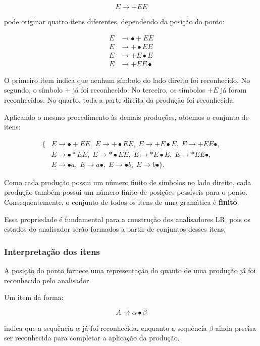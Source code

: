 \documentclass[
  brazilian,
  letterpaper,
]{book}
\theoremstyle{plain}
\theoremstyle{definition}
\theoremstyle{remark}
\begin{document}
\[
E\rightarrow +EE
\]

pode originar quatro itens diferentes, dependendo da posição do ponto:

\[
\begin{aligned}
E&\rightarrow\bullet +EE\\
E&\rightarrow+\bullet EE\\
E&\rightarrow+E\bullet E\\
E&\rightarrow+EE\bullet
\end{aligned}
\]

O primeiro item indica que nenhum símbolo do lado direito foi
reconhecido. No segundo, o símbolo \(+\) já foi reconhecido. No
terceiro, os símbolos \(+E\) já foram reconhecidos. No quarto, toda a
parte direita da produção foi reconhecida.

Aplicando o mesmo procedimento às demais produções, obtemos o conjunto
de itens:

\[
\begin{aligned}
\{&
E\rightarrow\bullet +EE,\;
E\rightarrow+\bullet EE,\;
E\rightarrow+E\bullet E,\;
E\rightarrow+EE\bullet,\\
&
E\rightarrow\bullet *EE,\;
E\rightarrow*\bullet EE,\;
E\rightarrow*E\bullet E,\;
E\rightarrow*EE\bullet,\\
&
E\rightarrow\bullet a,\;
E\rightarrow a\bullet,\;
E\rightarrow\bullet b,\;
E\rightarrow b\bullet
\}.
\end{aligned}
\]

Como cada produção possui um número finito de símbolos no lado direito,
cada produção também possui um número finito de posições possíveis para
o ponto. Consequentemente, o conjunto de todos os itens de uma gramática
é \textbf{finito}.

Essa propriedade é fundamental para a construção dos analisadores LR,
pois os estados do analisador serão formados a partir de conjuntos
desses itens.

\subsubsection{Interpretação dos
itens}\label{interpretauxe7uxe3o-dos-itens}

A posição do ponto fornece uma representação do quanto de uma produção
já foi reconhecido pelo analisador.

Um item da forma:

\[
A\rightarrow\alpha\bullet\beta
\]

indica que a sequência \(\alpha\) já foi reconhecida, enquanto a
sequência \(\beta\) ainda precisa ser reconhecida para completar a
aplicação da produção.
\end{document}
